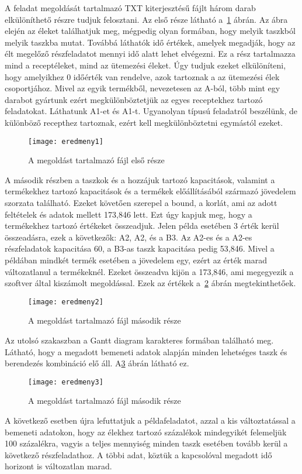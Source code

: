 A feladat megoldását tartalmazó TXT kiterjesztésű fájlt három darab elkülöníthető részre tudjuk felosztani. Az első része látható a~\ref{eredmeny1} ábrán. Az ábra elején az éleket találhatjuk meg, mégpedig olyan formában, hogy melyik taszkból melyik taszkba mutat. Továbbá láthatók idő értékek, amelyek megadják, hogy az élt megelőző részfeladatot mennyi idő alatt lehet elvégezni. Ez a rész tartalmazza mind a receptéleket, mind az ütemezési éleket. Úgy tudjuk ezeket elkülöníteni, hogy amelyikhez 0 időérték van rendelve, azok tartoznak a az ütemezési élek csoportjához. Mivel az egyik termékből, nevezetesen az A-ból, több mint egy darabot gyártunk ezért megkülönböztetjük az egyes receptekhez tartozó feladatokat. Láthatunk A1-et és A1-t. Ugyanolyan típusú feladatról beszélünk, de különböző recepthez tartoznak, ezért kell megkülönböztetni egymástól ezeket. 
\begin{figure}[H]
\begin{center}
\texttt{[image: eredmeny1]}
\caption{A megoldást tartalmazó fájl első része}
\label{eredmeny1}
\end{center}
\end{figure}
A második részben a taszkok és a hozzájuk tartozó kapacitások, valamint a termékekhez tartozó kapacitások és a termékek előállításából származó jövedelem szorzata található. Ezeket követően szerepel a bound, a korlát, ami az adott feltételek és adatok mellett 173,846 lett. Ezt úgy kapjuk meg, hogy a termékekhez tartozó értékeket összeadjuk. Jelen példa esetében 3 érték kerül összeadásra, ezek a következők: A2, A2, és a B3. Az A2-es és a A2-es részfeladatok kapacitása 60, a B3-as taszk kapacitása pedig 53,846. Mivel a példában mindkét termék esetében a jövedelem egy, ezért az érték marad változatlanul a termékeknél. Ezeket összeadva kijön a 173,846, ami megegyezik a szoftver által kiszámolt megoldással. Ezek az értékek a~\ref{eredmeny2} ábrán megtekinthetőek.
\begin{figure}[H]
\begin{center}
\texttt{[image: eredmeny2]}
\caption{A megoldást tartalmazó fájl második része}
\label{eredmeny2}
\end{center}
\end{figure}
Az utolsó szakaszban a Gantt diagram karakteres formában található meg. Látható, hogy a megadott bemeneti adatok alapján minden lehetséges taszk és berendezés kombináció elő áll. A\ref{eredmeny3} ábrán látható ez. 
\begin{figure}[H]
\begin{center}
\texttt{[image: eredmeny3]}
\caption{A megoldást tartalmazó fájl második része}
\label{eredmeny3}
\end{center}
\end{figure}
A következő esetben újra lefuttatjuk a példafeladatot, azzal a kis változtatással a bemeneti adatokon, hogy az élekhez tartozó százalékok mindegyikét felemeljük 100 százalékra, vagyis a teljes mennyiség minden taszk esetében tovább kerül a következő részfeladathoz. A többi adat, köztük a kapcsolóval megadott idő horizont is változatlan marad. 

